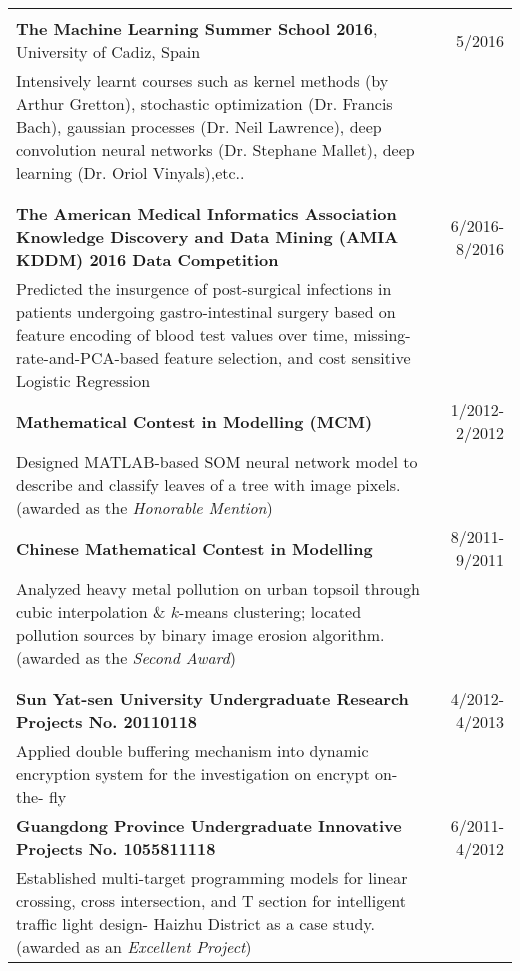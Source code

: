 \begin{longtable}{Xr}
\noindent{\it Professional Training}\\
{\bf The Machine Learning Summer School 2016}, University of Cadiz, Spain& 5/2016\\
Intensively learnt courses such as kernel methods (by Arthur Gretton), stochastic optimization (Dr. Francis Bach), gaussian processes (Dr. Neil Lawrence), deep convolution neural networks (Dr. Stephane Mallet), deep learning (Dr. Oriol Vinyals),etc..\\
&\\
\noindent{\it Competitions}\\
\textbf{The American Medical Informatics Association Knowledge Discovery and Data Mining (AMIA KDDM) 2016 Data Competition}&6/2016-8/2016\\
Predicted the insurgence of post-surgical infections in patients undergoing gastro-intestinal surgery based on feature encoding of blood test values over time, missing-rate-and-PCA-based feature selection, and cost sensitive Logistic Regression&\\
\textbf{Mathematical Contest in Modelling (MCM) }& 1/2012-2/2012\\
Designed MATLAB-based SOM neural network model to describe and classify leaves of a tree with image pixels. (awarded as the {\it Honorable Mention})&\\
\textbf{Chinese Mathematical Contest in Modelling}& 8/2011-9/2011\\
Analyzed heavy metal pollution on urban topsoil through cubic interpolation \& $k$-means clustering; located pollution sources by binary image erosion algorithm. (awarded as the {\it Second Award})&\\
&\\
\noindent{\it Student Projects}\\
{\bf Sun Yat-sen University Undergraduate Research Projects No. 20110118}&4/2012-4/2013\\
Applied double buffering mechanism into dynamic encryption system for the investigation on encrypt on- the- fly\\
\textbf{Guangdong Province Undergraduate Innovative Projects No. 1055811118} & 6/2011-4/2012\\
Established multi-target programming models for linear crossing, cross intersection, and T section for intelligent traffic light design- Haizhu District as a case study. (awarded as an {\it Excellent Project})&\\
\end{longtable}
